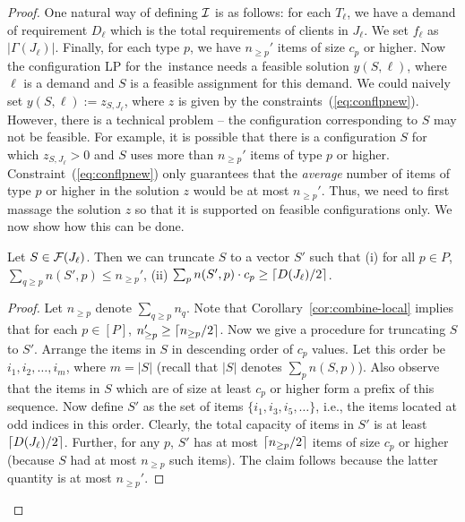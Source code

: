 \begin{proof}
One natural way of defining ${\cal I}$ is as follows: for each $T_\ell$, we have a demand of requirement $D_\ell$ which is the total requirements
of clients in $J_\ell$. We set $f_\ell$ as $|\Gamma(J_\ell)|$. Finally, for each type $p$, we have $n_{\geq p}'$ items of size $c_p$ or higher. 
Now the configuration LP for the~\cckp instance needs a feasible solution $y(S,\ell)$, where $\ell$ is a demand and $S$ is a feasible assignment 
for this demand. We could naively set $y(S,\ell) := z_{S,J_\ell}$, where $z$ is given by  the constraints~(\ref{eq:conflpnew}). However, there
is a technical problem -- the configuration corresponding to $S$ may not be feasible. For example, it is possible that there is a configuration $S$ 
for which $z_{S, J_\ell} > 0$ and 
$S$ uses more than $n_{\geq p}'$ items of type $p$ or higher. Constraint~(\ref{eq:conflpnew}) only guarantees that the {\em average} number
of items of type $p$ or higher in the solution $z$ would be at most $n_{\geq p}'$. Thus, we need to first massage the solution $z$ so that it is
supported on feasible configurations only. We now show how this can be done. 
\begin{claim}
\label{cl:massage}
Let $S \in {\cal F}(J_\ell)$. Then we can truncate $S$ to a vector $S'$ such that  (i) for all $p \in P$, $\sum_{q \geq p} n(S',p) \leq n_{\geq p}'$, 
(ii) $\sum_p n(S',p) \cdot c_p \geq \lceil D(J_\ell)/2\rceil$. 
\end{claim}
\begin{proof}
Let $n_{\geq p}$ denote $\sum_{q \geq p} n_q$. Note that Corollary~\ref{cor:combine-local} implies that for each $p \in [P]$, $n_{\geq p}' 
\geq \lceil n_{\geq p}/2\rceil$. Now we give a procedure for truncating $S$ to $S'$. Arrange the items in $S$ in descending order of $c_p$ values. 
Let this order be $i_1, i_2, \ldots, i_m$, where $m = |S|$ (recall that $|S|$ denotes $\sum_p n(S,p)$). Also observe that the items in $S$
which are of size at least $c_p$ or higher form a prefix of this sequence. Now define $S'$ as the set of items $\{i_1, i_3, i_5, \ldots\}$, i.e., 
the items located at odd indices in this order. Clearly, the total capacity of items in $S'$ is at least $\lceil D(J_\ell)/2\rceil$. Further, for any $p$, 
 $S'$ has at most $\lceil n_{\geq p}/2\rceil$ items of size $c_p$ or higher (because $S$ had at most $n_{\geq p}$ such items). 
 The claim follows because the latter quantity is at most $n_{\geq p}'$. 
\end{proof}


\end{proof}
